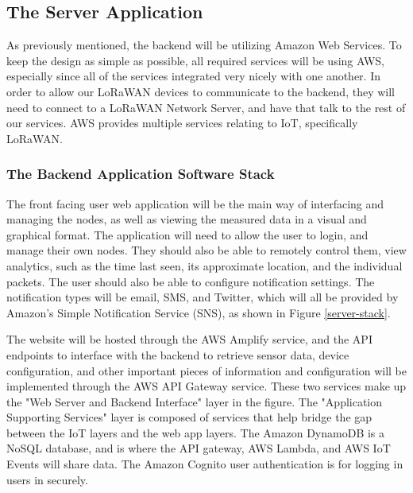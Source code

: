 \subsection{The Server Application}
As previously mentioned, the backend will be utilizing Amazon Web Services. To keep the design as
simple as possible, all required services will be using AWS, especially since all of the services
integrated very nicely with one another. In order to allow our LoRaWAN devices to communicate to the
backend, they will need to connect to a LoRaWAN Network Server, and have that talk to the rest of
our services. AWS provides multiple services relating to IoT, specifically LoRaWAN.

\subsubsection{The Backend Application Software Stack}
The front facing user web application will be the main way of interfacing and managing the nodes, as
well as viewing the measured data in a visual and graphical format. The application will need to
allow the user to login, and manage their own nodes. They should also be able to remotely control
them, view analytics, such as the time last seen, its approximate location, and the individual
packets. The user should also be able to configure notification settings. The notification types
will be email, SMS, and Twitter, which will all be provided by Amazon's Simple Notification Service
(SNS), as shown in Figure \ref{server-stack}. 

The website will be hosted through the AWS Amplify
service, and the API endpoints to interface with the backend to retrieve sensor data, device
configuration, and other important pieces of information and configuration will be implemented
through the AWS API Gateway service. These two services make up the "Web Server and Backend
Interface" layer in the figure. The "Application Supporting Services" layer is composed of services
that help bridge the gap between the IoT layers and the web app layers. The Amazon DynamoDB is
a NoSQL database, and is where the API gateway, AWS Lambda, and AWS IoT Events will share data. The
Amazon Cognito user authentication is for logging in users in securely. 

